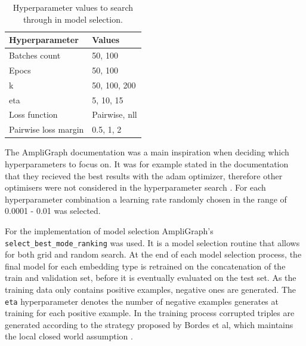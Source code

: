 \begin{table}[]
\centering
\begin{tabular}{|l|l|}
\hline
\textbf{Hyperparameter}      & \textbf{Values}             \\ \hline
Batches count       & 50, 100                              \\ \hline
Epocs               & 50, 100                          \\ \hline
k                   & 50, 100, 200                     \\ \hline
eta                 & 5, 10, 15                            \\ \hline
Loss function   & Pairwise, nll                         \\ \hline
Pairwise loss margin    & 0.5, 1, 2                    \\ \hline
\end{tabular}
\caption{Hyperparameter values to search through in model selection.}
\end{table}
The AmpliGraph documentation was a main inspiration when deciding which hyperparameters to focus on. It was for example stated in the documentation that they recieved the best results with the adam optimizer, therefore other optimisers were not considered in the hyperparameter search \cite{ampligraph_documentation}. For each hyperparameter combination a learning rate randomly chosen in the range of 0.0001 - 0.01 was selected. 

For the implementation of model selection AmpliGraph's \texttt{select\_best\_mode\_ranking} was used. It is a model selection routine that allows for both grid and random search. At the end of each model selection process, the final model for each embedding type is retrained on the concatenation of the train and validation set, before it is eventually evaluated on the test set. As the training data only contains positive examples, negative ones are generated. The \texttt{eta} hyperparameter denotes the number of negative examples generates at training for each positive example. In the training process corrupted triples are generated according to the strategy proposed by Bordes et al, which maintains the local closed world assumption \cite{TransE}.

